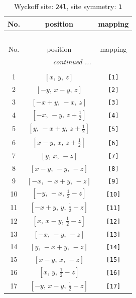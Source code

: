 \documentclass[fleqn,8pt]{jsarticle}
\begin{document}
\begin{longtable}{ccc}
\caption{Wyckoff site: {\tt 24l}, site symmetry: {\tt 1}}
 \\
 \hline \hline
No. & position & mapping \\ \hline \endfirsthead

\multicolumn{2}{l}{\tablename\ \thetable{}} \\
 \hline \hline
No. & position & mapping \\ \hline \endhead

 \hline \hline
\multicolumn{2}{r}{\footnotesize\it continued ...} \\ \endfoot

 \hline \hline
\multicolumn{2}{r}{} \\ \endlastfoot

1 & $\left[ x,\, y,\, z \right]$ & {\tt [1]} \\ \hline
2 & $\left[ - y,\, x - y,\, z \right]$ & {\tt [2]} \\ \hline
3 & $\left[ - x + y,\, - x,\, z \right]$ & {\tt [3]} \\ \hline
4 & $\left[ - x,\, - y,\, z + \frac{1}{2} \right]$ & {\tt [4]} \\ \hline
5 & $\left[ y,\, - x + y,\, z + \frac{1}{2} \right]$ & {\tt [5]} \\ \hline
6 & $\left[ x - y,\, x,\, z + \frac{1}{2} \right]$ & {\tt [6]} \\ \hline
7 & $\left[ y,\, x,\, - z \right]$ & {\tt [7]} \\ \hline
8 & $\left[ x - y,\, - y,\, - z \right]$ & {\tt [8]} \\ \hline
9 & $\left[ - x,\, - x + y,\, - z \right]$ & {\tt [9]} \\ \hline
10 & $\left[ - y,\, - x,\, \frac{1}{2} - z \right]$ & {\tt [10]} \\ \hline
11 & $\left[ - x + y,\, y,\, \frac{1}{2} - z \right]$ & {\tt [11]} \\ \hline
12 & $\left[ x,\, x - y,\, \frac{1}{2} - z \right]$ & {\tt [12]} \\ \hline
13 & $\left[ - x,\, - y,\, - z \right]$ & {\tt [13]} \\ \hline
14 & $\left[ y,\, - x + y,\, - z \right]$ & {\tt [14]} \\ \hline
15 & $\left[ x - y,\, x,\, - z \right]$ & {\tt [15]} \\ \hline
16 & $\left[ x,\, y,\, \frac{1}{2} - z \right]$ & {\tt [16]} \\ \hline
17 & $\left[ - y,\, x - y,\, \frac{1}{2} - z \right]$ & {\tt [17]} \\ \hline

\end{longtable}
\end{document}
